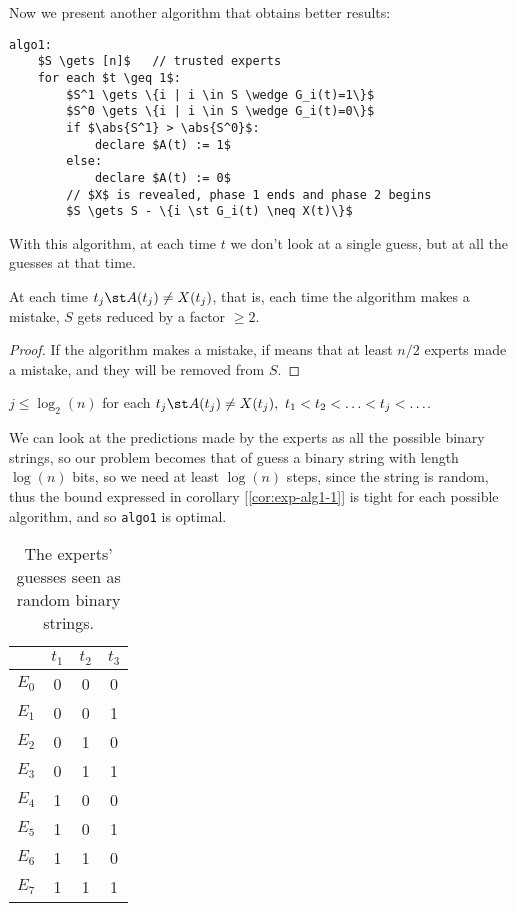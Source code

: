Now we present another algorithm that obtains better results:
\begin{lstlisting}[caption={Algo 1}, label={lst:exp-algo1}]
algo1:
    $S \gets [n]$   // trusted experts
    for each $t \geq 1$:
        $S^1 \gets \{i | i \in S \wedge G_i(t)=1\}$
        $S^0 \gets \{i | i \in S \wedge G_i(t)=0\}$
        if $\abs{S^1} > \abs{S^0}$:
            declare $A(t) := 1$
        else:
            declare $A(t) := 0$
        // $X$ is revealed, phase 1 ends and phase 2 begins
        $S \gets S - \{i \st G_i(t) \neq X(t)\}$
\end{lstlisting}

\obs With this algorithm, at each time $t$ we don't look at a single guess, but at all the guesses at that time.

\begin{lem}\label{lem:exp-alg1-1}
    At each time $t_j \st A(t_j) \neq X(t_j)$, that is, each time the algorithm makes a mistake, $S$ gets reduced by a factor $\geq 2$.
\end{lem}
\begin{proof}
    If the algorithm makes a mistake, if means that at least $n/2$ experts made a mistake, and they will be removed from $S$.
\end{proof}

\begin{cor}\label{cor:exp-alg1-1}
    $j \leq \log_2(n)$ for each $t_j \st A(t_j) \neq X(t_j),\ t_1 < t_2 < \ldots < t_j < \ldots$.
\end{cor}

\begin{obs}
    We can look at the predictions made by the experts as all the possible binary strings, so our problem becomes that of guess a binary string with length $\log(n)$ bits, so we need at least $\log(n)$ steps, since the string is random, thus the bound expressed in corollary [\ref{cor:exp-alg1-1}] is tight for each possible algorithm, and so \texttt{algo1} is optimal.
    
    \begin{table}[h]
        \centering
        \begin{tabular}{c|c|c|c}
            & $t_1$ & $t_2$ & $t_3$ \\ \hline
            $E_0$ & 0     & 0     & 0     \\
            $E_1$ & 0     & 0     & 1     \\
            $E_2$ & 0     & 1     & 0     \\
            $E_3$ & 0     & 1     & 1     \\
            $E_4$ & 1     & 0     & 0     \\
            $E_5$ & 1     & 0     & 1     \\
            $E_6$ & 1     & 1     & 0     \\
            $E_7$ & 1     & 1     & 1    
        \end{tabular}
        \caption{The experts' guesses seen as random binary strings.}
        \label{tab:exp-alg1-strings}
    \end{table}
\end{obs}


